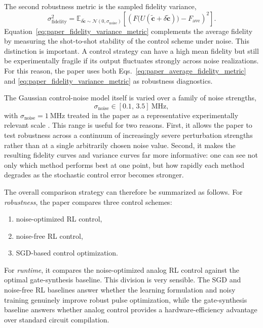 The second robustness metric is the sampled fidelity variance,
\begin{equation}
\sigma_{\mathrm{fidelity}}^{2}
=
\mathbb{E}_{\delta \tilde{\bm{c}} \sim \mathcal{N}(0,\sigma_{\mathrm{noise}})}
\left[
\left(
F\bigl(U(\tilde{\bm{c}}+\delta \tilde{\bm{c}})\bigr)
-
F_{\mathrm{ave}}
\right)^{2}
\right].
\label{eq:paper_fidelity_variance_metric}
\end{equation}
Equation~\eqref{eq:paper_fidelity_variance_metric} complements the average fidelity by measuring the shot-to-shot stability of the control scheme under noise. This distinction is important. A control strategy can have a high mean fidelity but still be experimentally fragile if its output fluctuates strongly across noise realizations. For this reason, the paper uses both Eqs.~\eqref{eq:paper_average_fidelity_metric} and \eqref{eq:paper_fidelity_variance_metric} as robustness diagnostics.

The Gaussian control-noise model itself is varied over a family of noise strengths,
\begin{equation}
\sigma_{\mathrm{noise}} \in [0.1,\,3.5]~\mathrm{MHz},
\label{eq:noise_variance_range}
\end{equation}
with \(\sigma_{\mathrm{noise}}=1~\mathrm{MHz}\) treated in the paper as a representative experimentally relevant scale \cite{Niu2019}. This range is useful for two reasons. First, it allows the paper to test robustness across a continuum of increasingly severe perturbation strengths rather than at a single arbitrarily chosen noise value. Second, it makes the resulting fidelity curves and variance curves far more informative: one can see not only which method performs best at one point, but how rapidly each method degrades as the stochastic control error becomes stronger.

The overall comparison strategy can therefore be summarized as follows. For \emph{robustness}, the paper compares three control schemes:
\begin{enumerate}
\item noise-optimized RL control,
\item noise-free RL control,
\item SGD-based control optimization.
\end{enumerate}
For \emph{runtime}, it compares the noise-optimized analog RL control against the optimal gate-synthesis baseline. This division is very sensible. The SGD and noise-free RL baselines answer whether the learning formulation and noisy training genuinely improve robust pulse optimization, while the gate-synthesis baseline answers whether analog control provides a hardware-efficiency advantage over standard circuit compilation.

